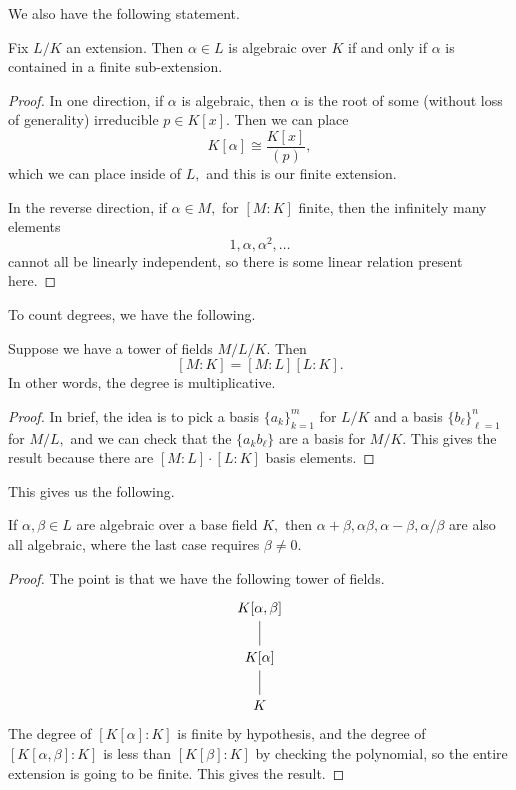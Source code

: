 We also have the following statement.
\begin{proposition}
	Fix $L/K$ an extension. Then $\alpha\in L$ is algebraic over $K$ if and only if $\alpha$ is contained in a finite sub-extension.
\end{proposition}
\begin{proof}
	In one direction, if $\alpha$ is algebraic, then $\alpha$ is the root of some (without loss of generality) irreducible $p\in K[x].$ Then we can place
	\[K[\alpha]\cong\frac{K[x]}{(p)},\]
	which we can place inside of $L,$ and this is our finite extension.

	In the reverse direction, if $\alpha\in M,$ for $[M:K]$ finite, then the infinitely many elements
	\[1,\alpha,\alpha^2,\ldots\]
	cannot all be linearly independent, so there is some linear relation present here.
\end{proof}
To count degrees, we have the following.
\begin{proposition}
	Suppose we have a tower of fields $M/L/K.$ Then
	\[[M:K]=[M:L][L:K].\]
	In other words, the degree is multiplicative.
\end{proposition}
\begin{proof}
	In brief, the idea is to pick a basis $\{a_k\}_{k=1}^m$ for $L/K$ and a basis $\{b_\ell\}_{\ell=1}^n$ for $M/L,$ and we can check that the $\{a_kb_\ell\}$ are a basis for $M/K.$ This gives the result because there are $[M:L]\cdot[L:K]$ basis elements.
\end{proof}
This gives us the following.
\begin{proposition}
	If $\alpha,\beta\in L$ are algebraic over a base field $K,$ then $\alpha+\beta,\alpha\beta,\alpha-\beta,\alpha/\beta$ are also all algebraic, where the last case requires $\beta\ne0.$
\end{proposition}
\begin{proof}
	The point is that we have the following tower of fields.
	\[\begin{tikzcd}
		{K[\alpha,\beta]} \\
		{K[\alpha]} \\
		K
		\arrow[no head, from=1-1, to=2-1]
		\arrow[no head, from=2-1, to=3-1]
	\end{tikzcd}\]
	The degree of $[K[\alpha]:K]$ is finite by hypothesis, and the degree of $[K[\alpha,\beta]:K]$ is less than $[K[\beta]:K]$ by checking the polynomial, so the entire extension is going to be finite. This gives the result.
\end{proof}
